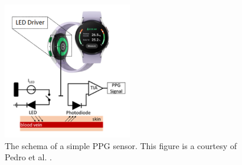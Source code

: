 \begin{figure}
	\centering
	\includegraphics[width=0.5\textwidth]{img/ppg.png}
	\caption{The schema of a simple \gls{PPG} sensor. This figure is a courtesy of Pedro et al. %
	.}
	\label{fig:method:ppg}
\end{figure}
